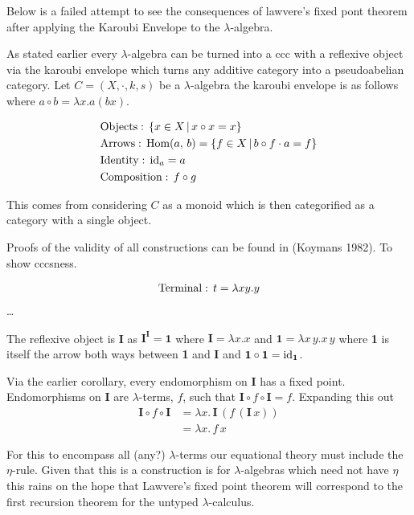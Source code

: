 \documentclass[a4paper,10pt]{article}
\begin{document}
Below is a failed attempt to see the consequences of lawvere's fixed pont
theorem after applying the Karoubi Envelope to the $\lambda$-algebra.

As stated earlier every $\lambda$-algebra can be turned into a ccc with a
reflexive object via the karoubi envelope which turns any additive category into
a pseudoabelian category. Let $C = (X, \cdot , k, s)$ be a $\lambda$-algebra the
karoubi envelope is as follows where $a \circ b = \lambda x . a (b x)$.

\begin{align*}
    &\textnormal{Objects}: \, \{ x \in X \, | \, x \circ x = x \} \\
    &\textnormal{Arrows}: \, \textnormal{Hom}(a, \, b) =  \{ f \in X \, | \, b
        \circ f
    \cdot a = f\} \\
    &\textnormal{Identity}: \, \textnormal{id}_{a} = a \\
    &\textnormal{Composition}: \, f \circ g
\end{align*}

This comes from considering $C$ as a monoid which is then categorified as a
category with a single object.

Proofs of the validity of all constructions can be found in (Koymans 1982). To
show cccsness.

\begin{align*}
    &\textnormal{Terminal}: \, t = \lambda x y . y \\
\end{align*}
\ldots

The reflexive object is \textbf{I} as $\textbf{I}^\textbf{I} = \textbf{1}$ where
$\textbf{I} = \lambda x.x$ and $\textbf{1} = \lambda x \, y . x \, y$ where
\textbf{1} is itself the arrow both ways between \textbf{1} and \textbf{I} and
$\textbf{1} \circ \textbf{1} = \textnormal{id}_{\textbf{1}}$.

Via the earlier corollary, every endomorphism on \textbf{I} has a fixed point.
Endomorphisms on \textbf{I} are $\lambda$-terms, $f$, such that $\textbf{I}
\circ f \circ \textbf{I} = f$. Expanding this out
\begin{align*}
    \textbf{I} \circ f \circ \textbf{I} &= \lambda x . \, \textbf{I} \, (f \, (\textbf{I}
    \, x)) \\
    &= \lambda x . \, f \, x
\end{align*}

For this to encompass all (any?) $\lambda$-terms our equational theory must
include the $\eta$-rule. Given that this is a construction is for
$\lambda$-algebras which need not have $\eta$ this rains on the hope that
Lawvere's fixed point theorem will correspond to the first recursion theorem for
the untyped $\lambda$-calculus.
\end{document}
